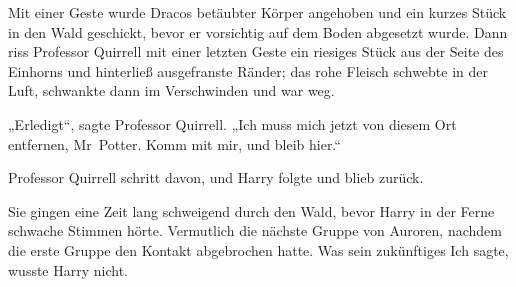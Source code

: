 Mit einer Geste wurde Dracos betäubter Körper angehoben und ein kurzes Stück in den Wald geschickt, bevor er vorsichtig auf dem Boden abgesetzt wurde. Dann riss Professor Quirrell mit einer letzten Geste ein riesiges Stück aus der Seite des Einhorns und hinterließ ausgefranste Ränder; das rohe Fleisch schwebte in der Luft, schwankte dann im Verschwinden und war weg.

„Erledigt“, sagte Professor Quirrell. „Ich muss mich jetzt von diesem Ort entfernen, Mr~Potter. Komm mit mir, und bleib hier.“

Professor Quirrell schritt davon, und Harry folgte und blieb zurück.

Sie gingen eine Zeit lang schweigend durch den Wald, bevor Harry in der Ferne schwache Stimmen hörte. Vermutlich die nächste Gruppe von Auroren, nachdem die erste Gruppe den Kontakt abgebrochen hatte. Was sein zukünftiges Ich sagte, wusste Harry nicht.


